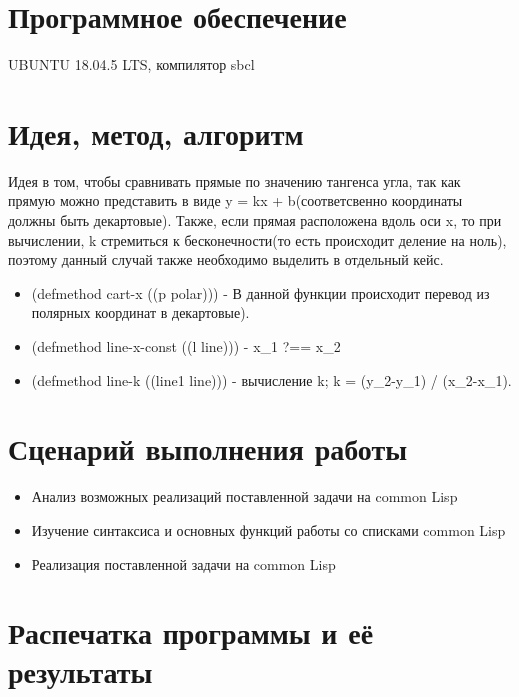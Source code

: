 \documentclass[12pt]{article}
\begin{document}
\section{Программное обеспечение}
UBUNTU 18.04.5 LTS, компилятор sbcl

\section{Идея, метод, алгоритм}
Идея в том, чтобы сравнивать прямые по значению тангенса угла, так как прямую можно представить в виде y = kx + b(соответсвенно координаты должны быть  декартовые). Также, если прямая расположена вдоль оси x, то при вычислении, k стремиться к бесконечности(то есть происходит деление на ноль), поэтому данный случай также необходимо выделить в отдельный кейс.
\begin{itemize}
\setlength{\itemsep}{-1mm} %
\item{(defmethod cart-x ((p polar))) - В данной функции происходит перевод из полярных координат в декартовые).}
\item{(defmethod line-x-const ((l line))) - x_{1} ?== x_{2}}

\item{(defmethod line-k ((line1 line))) - вычисление k; k = (y_{2}-y_{1}) / (x_{2}-x_{1}).}

\end{itemize}

\section{Сценарий выполнения работы}
\begin{itemize}
\setlength{\itemsep}{-1mm}
\item Анализ возможных реализаций поставленной задачи на common Lisp
\item Изучение синтаксиса и основных функций работы со списками common Lisp
\item Реализация поставленной задачи на common Lisp
\end{itemize}
\section{Распечатка программы и её результаты}
\end{document}
